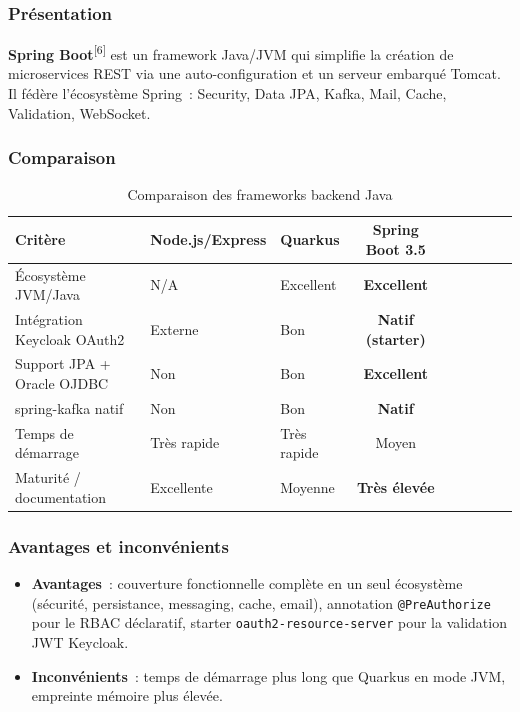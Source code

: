 \subsubsection*{Présentation}

\textbf{Spring Boot}\textsuperscript{[6]} est un framework Java/JVM qui simplifie la création de
microservices REST via une auto-configuration et un serveur embarqué Tomcat. Il
fédère l'écosystème Spring~: Security, Data JPA, Kafka, Mail, Cache, Validation,
WebSocket.

\subsubsection*{Comparaison}

\begin{table}[H]
\centering
\caption{Comparaison des frameworks backend Java}
\label{tab:cmp_backend}
\begin{tabularx}{\textwidth}{VlVCVCVCV}
\hline
\textbf{Critère} & \textbf{Node.js/Express} & \textbf{Quarkus} & \textbf{Spring Boot 3.5} \\
\hline
Écosystème JVM/Java          & N/A      & Excellent & \textbf{Excellent} \\
\hline
Intégration Keycloak OAuth2  & Externe  & Bon       & \textbf{Natif (starter)} \\
\hline
Support JPA + Oracle OJDBC   & Non      & Bon       & \textbf{Excellent} \\
\hline
spring-kafka natif           & Non      & Bon       & \textbf{Natif} \\
\hline
Temps de démarrage           & Très rapide & Très rapide & Moyen \\
\hline
Maturité / documentation     & Excellente & Moyenne  & \textbf{Très élevée} \\
\hline
\end{tabularx}
\end{table}

\subsubsection*{Avantages et inconvénients}

\begin{itemize}[leftmargin=*,nosep]
  \item \textbf{Avantages}~: couverture fonctionnelle complète en un seul écosystème
        (sécurité, persistance, messaging, cache, email), annotation
        \texttt{@PreAuthorize} pour le RBAC déclaratif, starter
        \texttt{oauth2-resource-server} pour la validation JWT Keycloak.
  \item \textbf{Inconvénients}~: temps de démarrage plus long que Quarkus en mode
        JVM, empreinte mémoire plus élevée.
\end{itemize}

